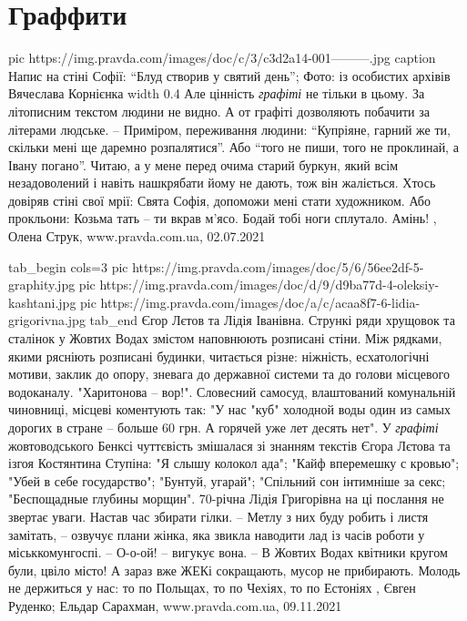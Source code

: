  
 
 
 
 
\chapter{Граффити}
\label{sec:slova.graffiti}

\ifcmt
  pic https://img.pravda.com/images/doc/c/3/c3d2a14-001---------.jpg
	caption Напис на стіні Софії: \enquote{Блуд створив у святий день}; Фото: із особистих архівів Вячеслава Корнієнка
	width 0.4
\fi
Але цінність \emph{графіті} не тільки в цьому. За літописним текстом людини не
видно.  А от графіті дозволяють побачити за літерами людське.  – Приміром,
переживання людини: \enquote{Купріяне, гарний же ти, скільки мені ще даремно
розпалятися}. Або \enquote{того не пиши, того не проклинай, а Івану погано}.
Читаю, а у мене перед очима старий буркун, який всім незадоволений і навіть
нашкрябати йому не дають, тож він жаліється.  Хтось довіряв стіні свої мрії:
Свята Софія, допоможи мені стати художником.  Або прокльони: Козьма тать – ти
вкрав м'ясо. Бодай тобі ноги сплутало. Амінь!
, 
Олена Струк, www.pravda.com.ua, 02.07.2021 

\ifcmt
  tab_begin cols=3
     pic https://img.pravda.com/images/doc/5/6/56ee2df-5-graphity.jpg
     pic https://img.pravda.com/images/doc/d/9/d9ba77d-4-oleksiy-kashtani.jpg
		 pic https://img.pravda.com/images/doc/a/c/acaa8f7-6-lidia-grigorivna.jpg
  tab_end
\fi
Єгор Лєтов та Лідія Іванівна.  Стрункі ряди хрущовок та сталінок у Жовтих Водах
змістом наповнюють розписані стіни.  Між рядками, якими рясніють розписані
будинки, читається різне: ніжність, есхатологічні мотиви, заклик до опору,
зневага до державної системи та до голови місцевого водоканалу.  "Харитонова –
вор!". Словесний самосуд, влаштований комунальній чиновниці, місцеві коментують
так: "У нас "куб" холодной воды один из самых дорогих в стране – больше 60 грн.
А горячей уже лет десять нет". У \emph{графіті} жовтоводського Бенксі
чуттєвість змішалася зі знанням текстів Єгора Лєтова та ізгоя Костянтина
Ступіна: "Я слышу колокол ада"; "Кайф вперемешку с кровью"; "Убей в себе
государство"; "Бунтуй, угарай"; "Спільний сон інтимніше за секс; "Беспощадные
глубины морщин".  70-річна Лідія Григорівна на ці послання не звертає уваги.
Настав час збирати гілки.  – Метлу з них буду робить і листя замітать, –
озвучує плани жінка, яка звикла наводити лад із часів роботи у міськкомунгоспі.
– О-о-ой! – вигукує вона. – В Жовтих Водах квітники кругом були, цвіло місто! А
зараз вже ЖЕКі сокращають, мусор не прибирають.  Молодь не держиться у нас: то
по Польщах, то по Чехіях, то по Естоніях
, 
Євген Руденко; Ельдар Сарахман, www.pravda.com.ua, 09.11.2021 

